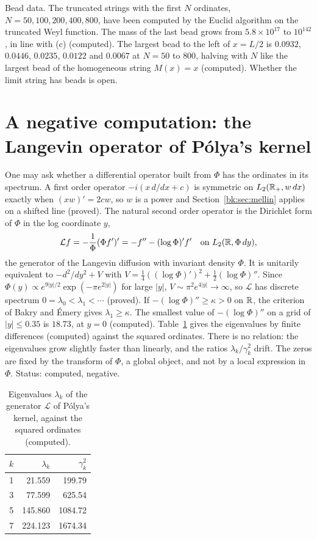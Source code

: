 Bead data. The truncated strings with the first $N$ ordinates, $N=50,100,200,400,800$, have been computed by the Euclid algorithm on the truncated Weyl function. The mass of the last bead grows from $5.8\times10^{17}$ to $10^{142}$, in line with (c) (computed). The largest bead to the left of $x=L/2$ is $0.0932$, $0.0446$, $0.0235$, $0.0122$ and $0.0067$ at $N=50$ to $800$, halving with $N$ like the largest bead of the homogeneous string $M(x)=x$ (computed). Whether the limit string has beads is open.

\section{A negative computation: the Langevin operator of P\'olya's kernel}\label{bk:sec:langevin}

One may ask whether a differential operator built from $\Phi$ has the ordinates in its spectrum. A first order operator $-i(x\,d/dx+c)$ is symmetric on $L_2(\mathbb{R}_+,w\,dx)$ exactly when $(xw)'=2cw$, so $w$ is a power and Section~\ref{bk:sec:mellin} applies on a shifted line (proved). The natural second order operator is the Dirichlet form of $\Phi$ in the log coordinate $y$,
\[
\mathcal Lf=-\frac1\Phi(\Phi f')'=-f''-(\log\Phi)'f'\quad\text{on }L_2(\mathbb{R},\Phi\,dy),
\]
the generator of the Langevin diffusion with invariant density $\Phi$. It is unitarily equivalent to $-d^2/dy^2+V$ with $V=\frac14((\log\Phi)')^2+\frac12(\log\Phi)''$. Since $\Phi(y)\propto e^{9|y|/2}\exp(-\pi e^{2|y|})$ for large $|y|$, $V\sim\pi^2e^{4|y|}\to\infty$, so $\mathcal L$ has discrete spectrum $0=\lambda_0<\lambda_1<\cdots$ (proved). If $-(\log\Phi)''\ge\kappa>0$ on $\mathbb{R}$, the criterion of Bakry and \'Emery gives $\lambda_1\ge\kappa$.
The smallest value of $-(\log\Phi)''$ on a grid of $|y|\le0.35$ is $18.73$, at $y=0$ (computed). Table~\ref{bk:tab:langevin} gives the eigenvalues by finite differences (computed) against the squared ordinates. There is no relation: the eigenvalues grow slightly faster than linearly, and the ratios $\lambda_k/\gamma_k^2$ drift. The zeros are fixed by the transform of $\Phi$, a global object, and not by a local expression in $\Phi$. Status: computed, negative.

\begin{table}[t]
\centering
\caption{Eigenvalues $\lambda_k$ of the generator $\mathcal L$ of P\'olya's kernel, against the squared ordinates (computed).}
\label{bk:tab:langevin}
\begin{tabular}{rrr}
\toprule
$k$ & $\lambda_k$ & $\gamma_k^2$\\
\midrule
1 & 21.559 & 199.79\\
3 & 77.599 & 625.54\\
5 & 145.860 & 1084.72\\
7 & 224.123 & 1674.34\\
\bottomrule
\end{tabular}
\end{table}

